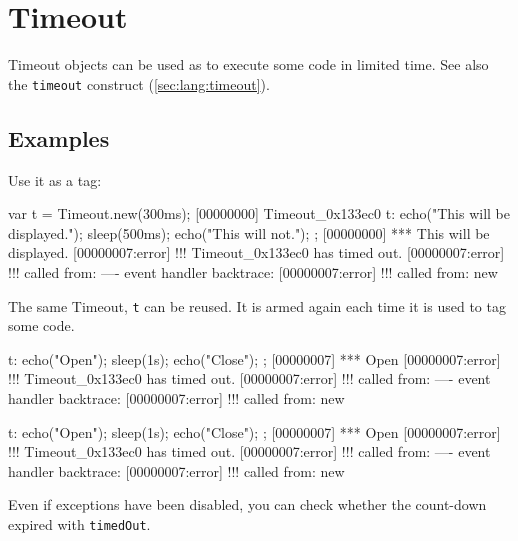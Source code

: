 
\section{Timeout}

Timeout objects can be used as  to execute some code in
limited time.  See also the \lstinline|timeout| construct
(\autoref{sec:lang:timeout}).

\subsection{Examples}

Use it as a tag:

\begin{urbiscript}
var t = Timeout.new(300ms);
[00000000] Timeout_0x133ec0
t:{
  echo("This will be displayed.");
  sleep(500ms);
  echo("This will not.");
};
[00000000] *** This will be displayed.
[00000007:error] !!! Timeout_0x133ec0 has timed out.
[00000007:error] !!!    called from: ---- event handler backtrace:
[00000007:error] !!!    called from: new
\end{urbiscript}

The same Timeout, \lstinline|t| can be reused.  It is armed again each
time it is used to tag some code.

\begin{urbiscript}
t: { echo("Open"); sleep(1s); echo("Close"); };
[00000007] *** Open
[00000007:error] !!! Timeout_0x133ec0 has timed out.
[00000007:error] !!!    called from: ---- event handler backtrace:
[00000007:error] !!!    called from: new

t: { echo("Open"); sleep(1s); echo("Close"); };
[00000007] *** Open
[00000007:error] !!! Timeout_0x133ec0 has timed out.
[00000007:error] !!!    called from: ---- event handler backtrace:
[00000007:error] !!!    called from: new
\end{urbiscript}

Even if exceptions have been disabled, you can check whether the
count-down expired with \lstinline|timedOut|.

